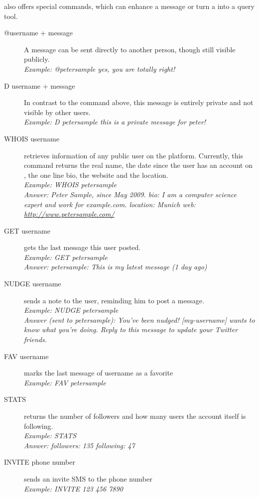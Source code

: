 \begin{description}
                \Twitter{} also offers special commands, which can enhance a
                message or turn a \Twitter{} into a query tool.
  \begin{description}
    \item[@username + message]
      A message can be sent directly to another person, though still visible
      publicly.\\
      \textit{Example: @petersample yes, you are totally right!}

    \item[D username + message]
      In contrast to the command above, this message is entirely private and
      not visible by other users.\\
      \textit{Example: D petersample this is a private message for peter!}

    \item[WHOIS username]
      retrieves information of any public user on the \Twitter{} platform.
      Currently, this command returns the real name, the date since the user
      has an account on \Twitter{}, the one line bio, the website and the
      location.\\
      \textit{Example: WHOIS petersample}\\
      \textit{Answer: Peter Sample, since May 2009. bio: I am a computer
              science expert and work for example.com. location: Munich web:
              \url{http://www.petersample.com/}}

    \item[GET username]
      gets the last message this user posted.\\
      \textit{Example: GET petersample}\\
      \textit{Answer: petersample: This is my latest message (1 day ago)}

    \item[NUDGE username]
      sends a note to the user, reminding him to post a message.\\
      \textit{Example: NUDGE petersample}\\
      \textit{Answer (sent to petersample): You've been nudged! [my-username] wants to know what you're doing. Reply to this
      message to update your Twitter friends.}

    \item[FAV username]
      marks the last message of username as a favorite\\
      \textit{Example: FAV petersample}

    \item[STATS]
      returns the number of followers and how many users the account itself is
      following.\\
      \textit{Example: STATS}\\
      \textit{Answer: followers: 135 following: 47}

    \item[INVITE phone number]
      sends an invite SMS to the phone number\\
      \textit{Example: INVITE 123 456 7890}

\end{description}
\end{description}

